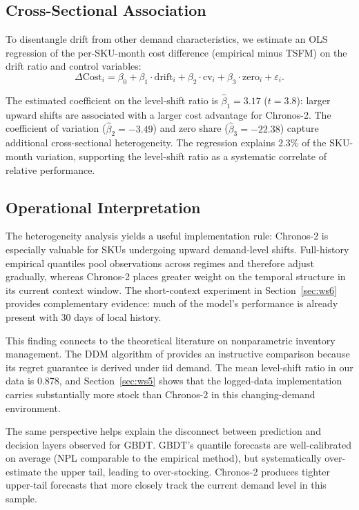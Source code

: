 \documentclass[msom,dblanonrev]{informs4}
\begin{document}
\subsection{Cross-Sectional Association}

To disentangle drift from other demand characteristics, we estimate an OLS regression of the per-SKU-month cost difference (empirical minus TSFM) on the drift ratio and control variables:
\begin{equation}\label{eq:ols_mechanism}
  \Delta\text{Cost}_i = \beta_0 + \beta_1 \cdot \text{drift}_i + \beta_2 \cdot \text{cv}_i + \beta_3 \cdot \text{zero}_i + \varepsilon_i.
\end{equation}

The estimated coefficient on the level-shift ratio is $\hat\beta_1 = 3.17$ ($t = 3.8$): larger upward shifts are associated with a larger cost advantage for Chronos-2.
The coefficient of variation ($\hat\beta_2 = -3.49$) and zero share ($\hat\beta_3 = -22.38$) capture additional cross-sectional heterogeneity.
The regression explains 2.3\% of the SKU-month variation, supporting the level-shift ratio as a systematic correlate of relative performance.

\subsection{Operational Interpretation}

The heterogeneity analysis yields a useful implementation rule: Chronos-2 is especially valuable for SKUs undergoing upward demand-level shifts.
Full-history empirical quantiles pool observations across regimes and therefore adjust gradually, whereas Chronos-2 places greater weight on the temporal structure in its current context window.
The short-context experiment in Section~\ref{sec:ws6} provides complementary evidence: much of the model's performance is already present with 30 days of local history.

This finding connects to the theoretical literature on nonparametric inventory management.
The DDM algorithm of \citet{ShiChenDuenyas2016} provides an instructive comparison because its regret guarantee is derived under iid demand.
The mean level-shift ratio in our data is 0.878, and Section~\ref{sec:ws5} shows that the logged-data implementation carries substantially more stock than Chronos-2 in this changing-demand environment.

The same perspective helps explain the disconnect between prediction and decision layers observed for GBDT.
GBDT's quantile forecasts are well-calibrated on average (NPL comparable to the empirical method), but systematically over-estimate the upper tail, leading to over-stocking.
Chronos-2 produces tighter upper-tail forecasts that more closely track the current demand level in this sample.
\end{document}
